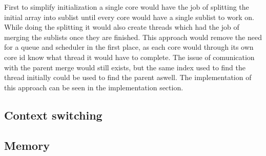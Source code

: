 First to simplify initialization a single core would have the job of splitting the initial array into sublist until every core would have a single sublist to work on. While doing the splitting it would also create threads which had the job of merging the sublists once they are finished. This approach would remove the need for a queue and scheduler in the first place, as each core would through its own core id know what thread it would have to complete. The issue of comunication with the parent merge would still exists, but the same index used to find the thread initially could be used to find the parent aswell. The implementation of this approach can be seen in the implementation section.


\subsection{Context switching}



\subsection{Memory}
